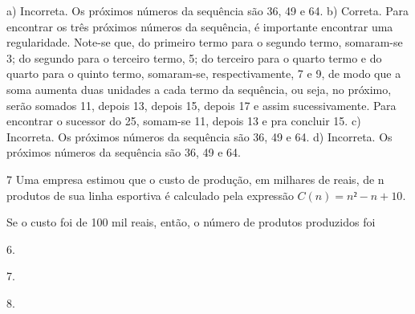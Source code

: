 \begin{escolha}
\begin{boxmedio}
\begin{boxmedio}
{\begin{boxpeq}
\begin{boxpeq}
{\begin{boxpeq}
\begin{boxmedio}
\begin{boxmedio}
\begin{boxpeq}
\begin{boxmedio}
\begin{boxpeq}
\begin{boxpeq}
\begin{boxpeq}
\begin{boxpeq}
\begin{boxmedio}
{\begin{boxmedio}
\begin{boxmedio}
\begin{boxpeq}
\begin{boxmedio}
\begin{boxpeq}
\begin{boxpeq}
\begin{boxpeq}
\begin{escolha}
{\begin{boxmedio}
\begin{boxpeq}
\begin{boxpeq}
\begin{boxpeq}
\begin{boxpeq}
\begin{boxpeq}
\begin{boxmedio}
\begin{boxpeq}
\begin{boxpeq}
\begin{boxpeq}
{\begin{boxpeq}
\begin{boxmedio}
\begin{boxpeq}
\begin{boxpeq}
\begin{boxpeq}
{\begin{boxpeq}
\begin{boxmedio}
{\begin{boxpeq}
\begin{boxpeq}
\begin{boxmedio}
\begin{boxmedio}
\begin{boxpeq}
\begin{boxpeq}
{\begin{boxpeq}
\begin{boxpeq}
\begin{boxpeq}
\begin{boxpeq}
\begin{boxpeq}
\begin{escolha}
\begin{escolha}
{\begin{boxmedio}
\begin{boxpeq}
\begin{q°}
\begin{boxmedio}
\begin{boxpeq}
\begin{boxpeq}
\begin{boxmedio}
\begin{boxmedio}
\begin{boxmedio}
\begin{boxmedio}
{a) Incorreta. Os próximos números da sequência são 36, 49 e 64.
b) Correta. Para encontrar os três próximos números da sequência, é importante
encontrar uma regularidade. Note-se que, do primeiro termo
para o segundo termo, somaram-se 3; do segundo para o terceiro termo, 5; 
do terceiro para o quarto termo e do quarto para o quinto
termo, somaram-se, respectivamente, 7 e 9, de modo que a soma aumenta duas
unidades a cada termo da sequência, ou seja, no próximo, serão somados 11,
depois 13, depois 15, depois 17 e assim sucessivamente. Para encontrar o
sucessor do 25, somam-se 11, depois 13 e pra concluir 15.
c) Incorreta. Os próximos números da sequência são 36, 49 e 64.
d) Incorreta. Os próximos números da sequência são 36, 49 e 64.}

\num{7} Uma empresa estimou que o custo de produção, em milhares de reais, de
n produtos de sua linha esportiva é calculado pela expressão $C(n)= n² - n + 10$.

Se o custo foi de 100 mil reais, então, o número de produtos produzidos foi

\begin{escolha}
  
  \item 6. 
  
  \item 7. 
  
  \item 8. 
  

\end{escolha}
\end{boxmedio}
\end{boxmedio}
\end{boxmedio}
\end{boxmedio}
\end{boxpeq}
\end{boxpeq}
\end{boxmedio}
\end{q°}
\end{boxpeq}
\end{boxmedio}}
\end{escolha}
\end{escolha}
\end{boxpeq}
\end{boxpeq}
\end{boxpeq}
\end{boxpeq}
\end{boxpeq}}
\end{boxpeq}
\end{boxpeq}
\end{boxmedio}
\end{boxmedio}
\end{boxpeq}
\end{boxpeq}}
\end{boxmedio}
\end{boxpeq}}
\end{boxpeq}
\end{boxpeq}
\end{boxpeq}
\end{boxmedio}
\end{boxpeq}}
\end{boxpeq}
\end{boxpeq}
\end{boxpeq}
\end{boxmedio}
\end{boxpeq}
\end{boxpeq}
\end{boxpeq}
\end{boxpeq}
\end{boxpeq}
\end{boxmedio}}
\end{escolha}
\end{boxpeq}
\end{boxpeq}
\end{boxpeq}
\end{boxmedio}
\end{boxpeq}
\end{boxmedio}
\end{boxmedio}}
\end{boxmedio}
\end{boxpeq}
\end{boxpeq}
\end{boxpeq}
\end{boxpeq}
\end{boxmedio}
\end{boxpeq}
\end{boxmedio}
\end{boxmedio}
\end{boxpeq}}
\end{boxpeq}
\end{boxpeq}}
\end{boxmedio}
\end{boxmedio}
\end{escolha}
